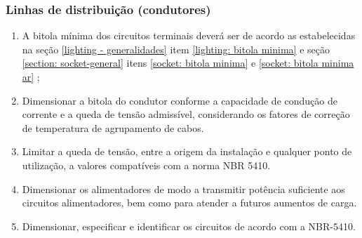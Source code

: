 \subsubsection{Linhas de distribuição (condutores)}

\begin{enumerate}
	\item A bitola mínima dos circuitos terminais deverá ser de acordo as estabelecidas na seção \ref{lighting - generalidades} item \ref{lighting: bitola minima} e seção \ref{section: socket-general} itens \ref{socket: bitola minima} e \ref{socket: bitola minima ar} ;
	\item Dimensionar a bitola do condutor conforme a capacidade de condução de corrente e a queda de tensão admissível, considerando os fatores de correção de temperatura de agrupamento de cabos. 
	\item Limitar a queda de tensão, entre a origem da instalação e qualquer ponto de utilização, a valores compatíveis com a norma NBR 5410. 
	\item Dimensionar os alimentadores de modo a transmitir potência suficiente aos circuitos alimentadores, bem como para atender a futuros aumentos de carga. 
	\item Dimensionar, especificar e identificar os circuitos de acordo com a NBR-5410.

	
\end{enumerate}
